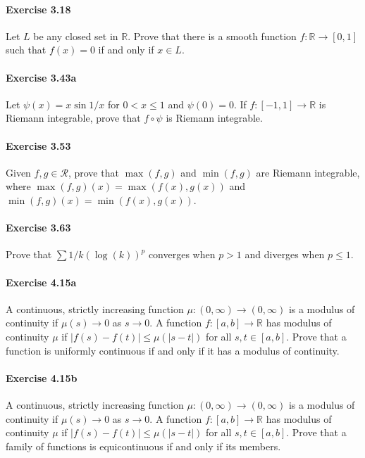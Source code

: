 \documentclass{article}
\begin{document}
\paragraph{Exercise 3.18} Let $L$ be any closed set in $\mathbb{R}$. Prove that there is a smooth function $f \colon \mathbb{R} \rightarrow [0, 1]$ such that $f(x) = 0$ if and only if $x \in L$.

\paragraph{Exercise 3.43a} Let $\psi(x) = x \sin 1/x$ for $0 < x \leq 1$ and $\psi(0) = 0$.  If $f \colon [-1, 1] \rightarrow \mathbb{R}$ is Riemann integrable, prove that $f \circ \psi$ is Riemann integrable.

\paragraph{Exercise 3.53} Given $f, g \in \mathcal{R}$, prove that $\max(f, g)$ and $\min(f, g)$ are Riemann integrable, where $\max(f, g)(x) = \max(f(x), g(x))$ and $\min(f, g)(x) = \min(f(x), g(x))$.

\paragraph{Exercise 3.63} Prove that $\sum 1/k(\log(k))^p$ converges when $p > 1$ and diverges when $p \leq 1$.

\paragraph{Exercise 4.15a} A continuous, strictly increasing function $\mu \colon (0, \infty) \rightarrow (0, \infty)$ is a modulus of continuity if $\mu(s) \rightarrow 0$ as $s \rightarrow 0$. A function $f \colon [a, b] \rightarrow \mathbb{R}$ has modulus of continuity $\mu$ if $|f(s) - f(t)| \leq \mu(|s - t|)$ for all $s, t \in [a, b]$. Prove that a function is uniformly continuous if and only if it has a modulus of continuity.

\paragraph{Exercise 4.15b} A continuous, strictly increasing function $\mu \colon (0, \infty) \rightarrow (0, \infty)$ is a modulus of continuity if $\mu(s) \rightarrow 0$ as $s \rightarrow 0$. A function $f \colon [a, b] \rightarrow \mathbb{R}$ has modulus of continuity $\mu$ if $|f(s) - f(t)| \leq \mu(|s - t|)$ for all $s, t \in [a, b]$. Prove that a family of functions is equicontinuous if and only if its members.
\end{document}
